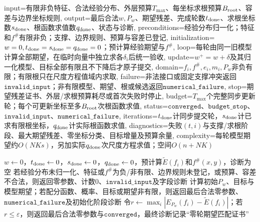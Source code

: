 \begin{AlgorithmContract}{
  input={有限非负特征、合法经验分布、外层预算$T_{\max}$、每坐标求根预算$B_{\rm root}$、容差与边界坐标规则},
  output={最后合法$w,P_w$、期望残差、完成轮数$t_{\rm done}$、求根坐标数$s_{\rm done}$、根函数求值数$q_{\rm done}$、状态与诊断},
  preconditions={经验分布归一化；特征和$f^\#$有限非负；支撑、边界规则、预算与容差已登记},
  initialization={$w=0,t_{\rm done}=s_{\rm done}=q_{\rm done}=0$；预计算经验期望与$f^\#$},
  loop={每轮由同一旧模型计算全部期望，在临时向量中独立求各$\delta_i$后统一验收},
  update={$w^+=w+\delta$及其归一化模型、目标全部有限且不下降后才原子提交},
  domain={$f_i,f^\#,e_i,m_i,P_w$非负有限；有限根只在尺度方程值域内求取},
  failure={非法接口或固定支撑冲突返回$\mathtt{invalid\_input}$；非有限模型、期望、根或候选返回$\mathtt{numerical\_failure}$},
  stop={期望残差证书、外层/求根预算耗尽或首次失败时停止},
  budget={$T_{\max}$个完整同步更新轮；每个可更新坐标至多$B_{\rm root}$次根函数求值},
  status={$\mathtt{converged}$、$\mathtt{budget\_stop}$、$\mathtt{invalid\_input}$、$\mathtt{numerical\_failure}$},
  iterations={$t_{\rm done}$计同步提交轮，$s_{\rm done}$计已求有限根坐标，$q_{\rm done}$计实际根函数求值},
  diagnostics={失败$(t,i)$与支撑/求根阶段、最大期望残差、零坐标分类、目标增量及预算余量},
  complexity={每轮模型期望约$O(NKs)$，另加实际$q_{\rm done}$次尺度方程求值；空间$O(n+NK)$}
}
\begin{algorithm}[H]
\caption{改进的迭代尺度法（IIS）}\label{alg:V3-C01-iis}
$w\leftarrow0$，$t_{\rm done}\leftarrow0$，$s_{\rm done}\leftarrow0$，$q_{\rm done}\leftarrow0$，预计算$\widetilde E(f_i)$和$f^\#(x,y)$，诊断为空\;
若经验分布未归一化、特征或$f^\#$为负/非有限、边界规则未登记，或预算、容差不合法，则返回零参数、计数$0$、$\mathtt{invalid\_input}$及字段诊断\;
计算初始$P_w$、目标与模型期望；若配分函数、概率、目标或期望非有限，则返回最后合法零参数、$\mathtt{numerical\_failure}$及初始化阶段诊断\;
令$r\leftarrow\max_i|E_{P_w}(f_i)-\widetilde E(f_i)|$；若$r\le\varepsilon$，则返回最后合法零参数与$\mathtt{converged}$，最终诊断记录“零轮期望匹配证书”\;
\end{algorithm}
\end{AlgorithmContract}
